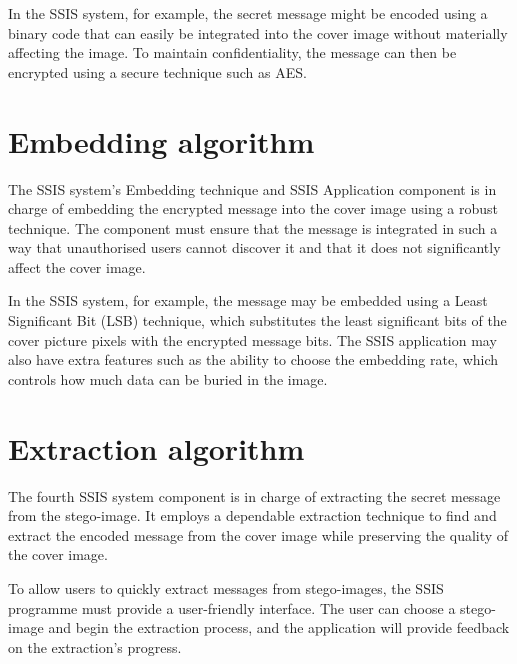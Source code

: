 In the SSIS system, for example, the secret message might be encoded using a binary code that can easily be integrated into the cover image without materially affecting the image. To maintain confidentiality, the message can then be encrypted using a secure technique such as AES.

\section{Embedding algorithm}
The SSIS system's Embedding technique and SSIS Application component is in charge of embedding the encrypted message into the cover image using a robust technique. The component must ensure that the message is integrated in such a way that unauthorised users cannot discover it and that it does not significantly affect the cover image.

In the SSIS system, for example, the message may be embedded using a Least Significant Bit (LSB) technique, which substitutes the least significant bits of the cover picture pixels with the encrypted message bits. The SSIS application may also have extra features such as the ability to choose the embedding rate, which controls how much data can be buried in the image.

\section{Extraction algorithm}
The fourth SSIS system component is in charge of extracting the secret message from the stego-image. It employs a dependable extraction technique to find and extract the encoded message from the cover image while preserving the quality of the cover image.

To allow users to quickly extract messages from stego-images, the SSIS programme must provide a user-friendly interface. The user can choose a stego-image and begin the extraction process, and the application will provide feedback on the extraction's progress.

